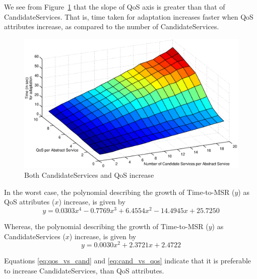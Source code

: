 \documentclass[10pt,journal,compsoc]{IEEEtran}
\begin{document}
We see from Figure~\ref{fig:svc_and_qos_scaling} that the slope of QoS axis is greater than that of CandidateServices. That is, time taken for adaptation increases faster when QoS attributes increase, as compared to the number of CandidateServices.

\begin{figure}[htbp]
\centering
\includegraphics[clip, trim=0.5cm 8cm 1cm 9cm, scale=0.45]{Figure17.eps}
\caption{Both CandidateServices and QoS increase \label{fig:svc_and_qos_scaling}}
\end{figure}

In the worst case, the polynomial describing the growth of Time-to-MSR ($y$) as QoS attributes ($x$) increase, is given by
\begin{equation}
    y =  0.0303x^{4}  - 0.7769x^{3} +   6.4554x^{2} - 14.4945x +  25.7250 \label{eq:qos_vs_cand}
\end{equation}

Whereas, the polynomial describing the growth of Time-to-MSR ($y$) as CandidateServices ($x$) increase, is given by
\begin{equation}
    y =  0.0030x^{2} +    2.3721x  +  2.4722 \label{eq:cand_vs_qos}
\end{equation}

Equations \ref{eq:qos_vs_cand} and \ref{eq:cand_vs_qos} indicate that it is preferable to increase CandidateServices, than QoS attributes. 
\end{document}
